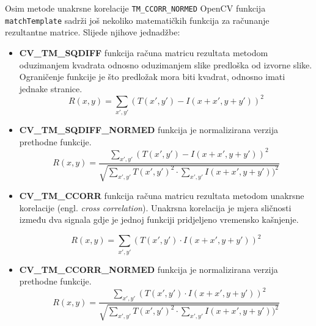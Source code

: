 Osim metode unakrsne korelacije \texttt{TM\_CCORR\_NORMED} OpenCV funkcija \texttt{matchTemplate} sadrži još nekoliko matematičkih funkcija za
računanje rezultantne matrice. Slijede njihove jednadžbe:
\begin{itemize}
    \item \textbf{CV\_TM\_SQDIFF} funkcija računa matricu
     rezultata metodom oduzimanjem kvadrata odnosno 
     oduzimanjem slike
     predloška od izvorne slike. Ograničenje funkcije je što
     predložak mora biti kvadrat, odnosno imati jednake stranice.
    \begin{equation}
         R\left ( x,y \right )= \sum_{{x}',{y}'} (T({x}',{y}')-I\left ( x+{x}',y+{y}' \right ))^{2}
	\end{equation}

    \item \textbf{CV\_TM\_SQDIFF\_NORMED} funkcija je 
    normalizirana verzija prethodne funkcije. 
    \begin{equation}
     R\left ( x,y \right )= \frac{\sum_{{x}',{y}'}(T({x}',{y}') - I\left ( x+{x}',y+{y}' \right ))^{2}}{\sqrt{\sum_{{x}',{y}'}T({x}',{y}')^{2}\cdot \sum_{{x}',{y}'}I\left ( x+{x}',y+{y}' \right ))^{2}}}
    \end{equation}
    
    \item \textbf{CV\_TM\_CCORR} funkcija računa matricu rezultata
    metodom unakrsne korelacije (engl. \textit{cross correlation}). 
    Unakrsna korelacija je mjera sličnosti između dva signala gdje
    je jednoj funkciji pridjeljeno vremensko kašnjenje.
    
    \begin{equation}
     R\left ( x,y \right )= \sum_{{x}',{y}'} (T({x}',{y}')\cdot I\left ( x+{x}',y+{y}' \right ))^{2}
    \end{equation}
    
    \item \textbf{CV\_TM\_CCORR\_NORMED} funkcija je normalizirana 
    verzija prethodne funkcije.
    \begin{equation}
    \label{f1}
     R\left ( x,y \right ) = \frac{\sum_{{x}',{y}'}(T({x}',{y}')\cdot I\left ( x+{x}',y+{y}' \right ))^{2}}{\sqrt{\sum_{{x}',{y}'}T({x}',{y}')^{2}\cdot \sum_{{x}',{y}'}I\left ( x+{x}',y+{y}' \right ))^{2}}}
    \end{equation}
    

\end{itemize}
